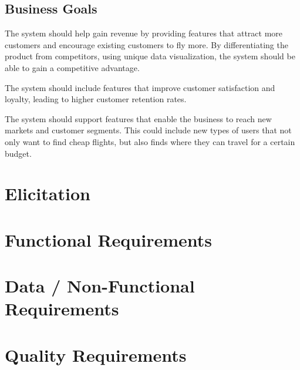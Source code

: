 \documentclass[a4paper]{article}
\begin{document}
\subsection{Business Goals}
The system should help gain revenue by providing features that attract more customers and encourage existing customers to fly more. By differentiating the product from competitors, using unique data visualization, the system should be able to gain a competitive advantage.

The system should include features that improve customer satisfaction and loyalty, leading to higher customer retention rates.

The system should support features that enable the business to reach new markets and customer segments. This could include new types of users that not only want to find cheap flights, but also finds where they can travel for a certain budget.

\section{Elicitation}


\section{Functional Requirements}


\section{Data / Non-Functional Requirements}


\section{Quality Requirements}

\end{document}
